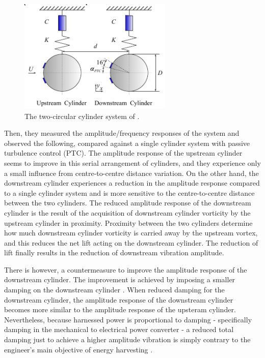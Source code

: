\documentclass[oneside]{utmthesis}
\begin{document}
\begin{figure}[!h]
  \centering
  \hspace{1cm} \includegraphics[width=0.65\textwidth]{figs/twoCylinderOscillator}
  \caption{The two-circular cylinder system of \citet{Ding2017}.}
  \label{fig:twoCylinderSystem}
\end{figure}

Then, they measured the amplitude/frequency responses of the system and observed the following, compared against a single cylinder system with passive turbulence control (PTC). The amplitude response of the upstream cylinder seems to improve in this serial arrangement of cylinders, and they experience only a small influence from centre-to-centre distance variation. On the other hand, the downstream cylinder experiences a reduction in the amplitude response compared to a single cylinder system and is more sensitive to the centre-to-centre distance between the two cylinders. The reduced amplitude response of the downstream cylinder is the result of the acquisition of downstream cylinder vorticity by the upstream cylinder in proximity. Proximity between the two cylinders determine how much downstream cylinder vorticity is carried away by the upstream vortex, and this reduces the net lift acting on the downstream cylinder. The reduction of lift finally results in the reduction of downstream vibration amplitude.

There is however, a countermeasure to improve the amplitude response of the downstream cylinder. The improvement is achieved by imposing a smaller damping on the downstream cylinder \citep{Xu2017}. When \citet{Xu2017} reduced damping for the downstream cylinder, the amplitude response of the downstream cylinder becomes more similar to the amplitude response of the upsteram cylinder. Nevertheless, because harnessed power is proportional to damping - specifically damping in the mechanical to electrical power converter - a reduced total damping just to achieve a higher amplitude vibration is simply contrary to the engineer's main objective of energy harvesting \citet{Bernitsas2009}.
\end{document}
